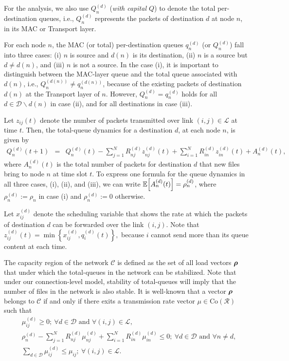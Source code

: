 \documentclass[10pt,onecolumn,draftclsnofoot,journal]{IEEEtran}
\newcommand{\brho}{\mbox{\boldmath$\rho$}}
\newcommand{\CoR}{\mbox{Co}(\mathcal{R})}
\newcommand{\mD} {\mathcal{D}}
\newcommand{\ben}{\begin{eqnarray*}}
\newcommand{\een}{\end{eqnarray*}}
\newcommand{\expect}[1]{{\mathbb E} \Bigl[ #1\Bigr]}
\begin{document}
For the analysis, we also use $Q_n^{(d)}$ (\textit{with capital $Q$}) to denote the total per-destination queues, i.e., $Q_n^{(d)}$ represents the packets of destination $d$ at node $n$, in its MAC or Transport layer.

For each node $n$, the MAC (or total) per-destination queues $q_{n}^{(d)}$ (or $Q_{n}^{(d)}$) fall into three cases: (i) $n$ is source and $d(n)$ is its destination, (ii) $n$ is a source but $d \neq d(n)$, and (iii) $n$ is not a source. In the case (i), it is important to distinguish between the MAC-layer queue and the total queue associated with $d(n)$, i.e., $Q_n^{(d(n))} \neq q_n^{(d(n))}$, because of the existing packets of destination $d(n)$ at the Transport layer of $n$. However, $Q_n^{(d)}=q_n^{(d)}$ holds for all $d \in \mathcal{D}\backslash d(n)$ in case (ii), and for all destinations in case (iii).

Let $z_{ij}(t)$ denote the number of packets transmitted over link $(i,j) \in \mathcal{L}$ at time $t$. Then, the total-queue dynamics for a destination $d$, at each node $n$, is given by
\ben \label{eq:queue dynamics}
Q_n^{(d)}(t+1)& =& Q_n^{(d)}(t)-\sum_{j=1}^N R^{(d)}_{nj}z_{nj}^{(d)}(t) +\sum_{i=1}^N R^{(d)}_{in}z_{in}^{(d)}(t)+A^{(d)}_n(t),
\een
where $A^{(d)}_n(t)$ is the total number of packets for destination $d$ that new files bring to node $n$ at time slot $t$. To express one formula for the queue dynamics in all three cases, (i), (ii), and (iii), we can write $\expect{A^{(d)}_n(t)}=\rho^{(d)}_n$, where $\rho^{(d)}_n:=\rho_n$ in case (i) and $\rho^{(d)}_n:=0$ otherwise.

Let $x_{ij}^{(d)}$ denote the scheduling variable
that shows the rate at which the packets of destination $d$ can be forwarded over the link $(i,j)$. Note that $
z_{ij}^{(d)}(t)=\min \left\{x_{ij}^{(d)}, q^{(d)}_i(t) \right\},
$
because $i$ cannot send more than its queue content at each time.


The capacity region of the network $\mathcal{C}$ is defined as the set of all load vectors $\brho$
that under which the total-queues in the network can be stabilized. Note that under our connection-level model, stability of total-queues will imply that the number of files in the network is also stable.
It is well-known \cite{Neely} that a vector $\brho$ belongs to $\mathcal{C}$ if and only if there exits a transmission rate vector $\mu \in \CoR$ such that
\begin{align*}
&\mu^{(d)}_{ij} \geq 0; \ \forall d \in \mathcal{D} \mbox{ and } \forall (i,j) \in \mathcal{L}, \\
&\rho^{(d)}_n-\sum_{j=1}^N R^{(d)}_{nj}\mu_{nj}^{(d)}+\sum_{i=1}^N R^{(d)}_{in}\mu_{in}^{(d)} \leq 0; \ \forall d \in \mathcal{D} \mbox{ and } \forall n \neq d,\\
&\sum_{d \in \mD} \mu_{ij}^{(d)} \leq \mu_{ij}; \  \forall (i,j) \in \mathcal{L}.
\end{align*}
\end{document}
